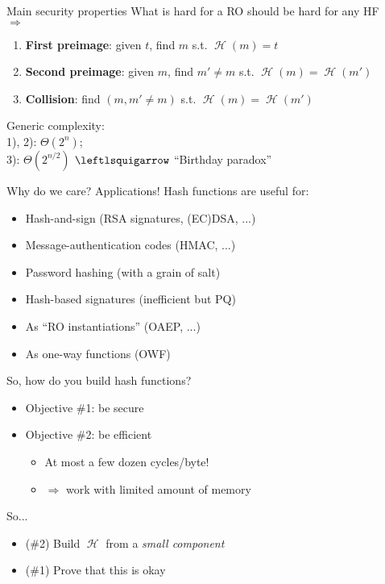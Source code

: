 \documentclass[xcolor=table,usenames,dvipsnames,compress]{beamer}
\DeclareMathOperator\hash{\mathcal{H}}
\begin{document}
\begin{frame}{Main security properties}
What is hard for a RO should be hard for any HF\\
$\Rightarrow$
\begin{enumerate}
\item \textbf{First preimage}: given $t$, find $m$ s.t. $\hash(m) = t$
\item \textbf{Second preimage}: given $m$, find $m' \neq m$ s.t. $\hash(m) = \hash(m')$
\item \textbf{Collision}: find $(m, m' \neq m)$ s.t. $\hash(m) = \hash(m')$
\end{enumerate}

\medskip

Generic complexity:\\
1), 2): $\Theta(2^n)$;\\
3): $\Theta(2^{n/2})$ $\leftlsquigarrow$ ``Birthday paradox''
\end{frame}

\begin{frame}{Why do we care? Applications!}
Hash functions are useful for:
\begin{itemize}
\item Hash-and-sign (RSA signatures, (EC)DSA, ...)
\item Message-authentication codes (HMAC, ...)
\item Password hashing (with a grain of salt)
\item Hash-based signatures (inefficient but PQ)
\item As ``RO instantiations'' (OAEP, ...)
\item As one-way functions (OWF)
\end{itemize}
\end{frame}

\begin{frame}{So, how do you build hash functions?}
\begin{itemize}
\item Objective \#1: be secure
\item Objective \#2: be efficient
\begin{itemize}
\item At most a few dozen cycles/byte!
\item $\Rightarrow$ work with limited amount of memory
\end{itemize}
\end{itemize}
So...
\begin{itemize}
\item (\#2) Build $\hash$ from a \emph{small component}
\item (\#1) Prove that this is okay
\end{itemize}
\end{frame}
\end{document}
